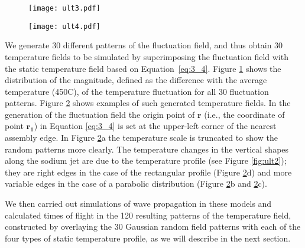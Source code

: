                 \begin{figure}[htbp]
                        \centerline{\texttt{[image: ult3.pdf]}}
                    \label{fig:ult3}
                \end{figure}

                \begin{figure}[htbp]
                        \centerline{\texttt{[image: ult4.pdf]}}
                    \label{fig:ult4}
                \end{figure}

                We generate 30 different patterns of the fluctuation field, and thus obtain 30 temperature fields to be simulated by superimposing the
fluctuation field with the static temperature field based on Equation~\ref{eq:3_4}.
                Figure \ref{fig:ult3} shows the distribution of the magnitude, defined as the difference with the average temperature (450\textdegree{}C), of
the temperature fluctuation for all 30 fluctuation patterns.
                Figure \ref{fig:ult4} shows examples of such generated temperature fields. In the generation of the fluctuation field the origin point of
$\bm{r}$ (i.e., the coordinate of point $\bm{r_1}$) in Equation \ref{eq:3_4} is set at the upper-left corner of the nearest assembly edge. In Figure
\ref{fig:ult4}a the temperature scale is truncated to show the random patterns more clearly. The temperature changes in the vertical shapes along the sodium
jet are due to the temperature profile (see Figure \ref{fig:ult2}); they are right edges in the case of the rectangular profile (Figure \ref{fig:ult4}d) and
more variable edges in the case of a parabolic distribution (Figure \ref{fig:ult4}b and \ref{fig:ult4}c).

                We then carried out simulations of wave propagation in these models and calculated times of flight in the 120 resulting patterns of the
temperature field, constructed by overlaying the 30 Gaussian random field patterns with each of the four types of static temperature profile, as we will
describe in the next section.

